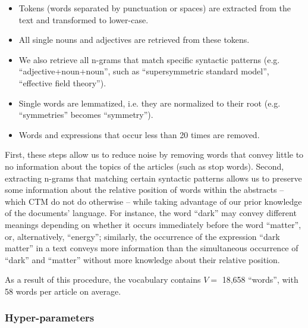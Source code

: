 \documentclass[smallextended]{svjour3}
\begin{document}
\begin{itemize}
    \item Tokens (words separated by punctuation or spaces) are extracted from the text and transformed to lower-case.
    \item All single nouns and adjectives are retrieved from these tokens.
    \item We also retrieve all n-grams that match specific syntactic patterns (e.g. ``adjective+noun+noun'', such as ``supersymmetric standard model'', ``effective field theory'').
    \item Single words are lemmatized, i.e. they are normalized to their root (e.g. ``symmetries'' becomes ``symmetry'').
    \item Words and expressions that occur less than 20 times are removed.
\end{itemize}

First, these steps allow us to reduce noise by removing words that convey little to no information about the topics of the articles (such as stop words). Second, extracting n-grams that matching certain syntactic patterns allows us to preserve some information about the relative position of words within the abstracts -- which CTM do not do otherwise -- while taking advantage of our prior knowledge of the documents' language. For instance, the word ``dark'' may convey different meanings depending on whether it occurs immediately before the word ``matter'', or, alternatively, ``energy''; similarly, the occurrence of the expression ``dark matter'' in a text conveys more information than the simultaneous occurrence of ``dark'' and ``matter'' without more knowledge about their relative position.

As a result of this procedure, the vocabulary contains $V=$ 18,658 ``words'', with 58 words per article on average.

\subsubsection{\label{appendix:hyper_parameter}Hyper-parameters}
\end{document}
